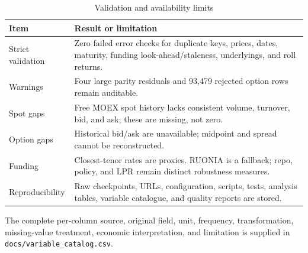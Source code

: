 \begin{table}[ht]
\small
\caption{Validation and availability limits}
\begin{tabularx}{\textwidth}{>{\raggedright\arraybackslash}p{3.2cm} X}
\toprule
Item & Result or limitation \\
\midrule
Strict validation & Zero failed error checks for duplicate keys, prices, dates, maturity, funding look-ahead/staleness, underlyings, and roll returns. \\
Warnings & Four large parity residuals and 93,479 rejected option rows remain auditable. \\
Spot gaps & Free MOEX spot history lacks consistent volume, turnover, bid, and ask; these are missing, not zero. \\
Option gaps & Historical bid/ask are unavailable; midpoint and spread cannot be reconstructed. \\
Funding & Closest-tenor rates are proxies. RUONIA is a fallback; repo, policy, and LPR remain distinct robustness measures. \\
Reproducibility & Raw checkpoints, URLs, configuration, scripts, tests, analysis tables, variable catalogue, and quality reports are stored. \\
\bottomrule
\end{tabularx}
\end{table}

The complete per-column source, original field, unit, frequency,
transformation, missing-value treatment, economic interpretation, and limitation
is supplied in \texttt{docs/variable\_catalog.csv}.
